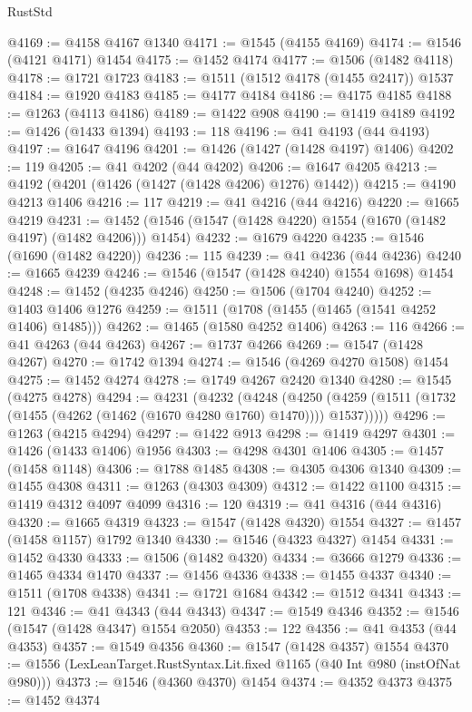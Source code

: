 \begin{lexlean}{RustStd}
\begin{coremodule}
@4169 := @4158 @4167 @1340
@4171 := @1545 (@4155 @4169)
@4174 := @1546 (@4121 @4171) @1454
@4175 := @1452 @4174
@4177 := @1506 (@1482 @4118)
@4178 := @1721 @1723
@4183 := @1511 (@1512 @4178 (@1455 @2417)) @1537
@4184 := @1920 @4183
@4185 := @4177 @4184
@4186 := @4175 @4185
@4188 := @1263 (@4113 @4186)
@4189 := @1422 @908
@4190 := @1419 @4189
@4192 := @1426 (@1433 @1394)
@4193 := 118
@4196 := @41 @4193 (@44 @4193)
@4197 := @1647 @4196
@4201 := @1426 (@1427 (@1428 @4197) @1406)
@4202 := 119
@4205 := @41 @4202 (@44 @4202)
@4206 := @1647 @4205
@4213 := @4192 (@4201 (@1426 (@1427 (@1428 @4206) @1276) @1442))
@4215 := @4190 @4213 @1406
@4216 := 117
@4219 := @41 @4216 (@44 @4216)
@4220 := @1665 @4219
@4231 := @1452 (@1546 (@1547 (@1428 @4220) @1554 (@1670 (@1482 @4197) (@1482 @4206))) @1454)
@4232 := @1679 @4220
@4235 := @1546 (@1690 (@1482 @4220))
@4236 := 115
@4239 := @41 @4236 (@44 @4236)
@4240 := @1665 @4239
@4246 := @1546 (@1547 (@1428 @4240) @1554 @1698) @1454
@4248 := @1452 (@4235 @4246)
@4250 := @1506 (@1704 @4240)
@4252 := @1403 @1406 @1276
@4259 := @1511 (@1708 (@1455 (@1465 (@1541 @4252 @1406) @1485)))
@4262 := @1465 (@1580 @4252 @1406)
@4263 := 116
@4266 := @41 @4263 (@44 @4263)
@4267 := @1737 @4266
@4269 := @1547 (@1428 @4267)
@4270 := @1742 @1394
@4274 := @1546 (@4269 @4270 @1508) @1454
@4275 := @1452 @4274
@4278 := @1749 @4267 @2420 @1340
@4280 := @1545 (@4275 @4278)
@4294 := @4231
    (@4232
      (@4248
        (@4250 (@4259 (@1511 (@1732 (@1455 (@4262 (@1462 (@1670 @4280 @1760) @1470)))) @1537)))))
@4296 := @1263 (@4215 @4294)
@4297 := @1422 @913
@4298 := @1419 @4297
@4301 := @1426 (@1433 @1406) @1956
@4303 := @4298 @4301 @1406
@4305 := @1457 (@1458 @1148)
@4306 := @1788 @1485
@4308 := @4305 @4306 @1340
@4309 := @1455 @4308
@4311 := @1263 (@4303 @4309)
@4312 := @1422 @1100
@4315 := @1419 @4312 @4097 @4099
@4316 := 120
@4319 := @41 @4316 (@44 @4316)
@4320 := @1665 @4319
@4323 := @1547 (@1428 @4320) @1554
@4327 := @1457 (@1458 @1157) @1792 @1340
@4330 := @1546 (@4323 @4327) @1454
@4331 := @1452 @4330
@4333 := @1506 (@1482 @4320)
@4334 := @3666 @1279
@4336 := @1465 @4334 @1470
@4337 := @1456 @4336
@4338 := @1455 @4337
@4340 := @1511 (@1708 @4338)
@4341 := @1721 @1684
@4342 := @1512 @4341
@4343 := 121
@4346 := @41 @4343 (@44 @4343)
@4347 := @1549 @4346
@4352 := @1546 (@1547 (@1428 @4347) @1554 @2050)
@4353 := 122
@4356 := @41 @4353 (@44 @4353)
@4357 := @1549 @4356
@4360 := @1547 (@1428 @4357) @1554
@4370 := @1556 (LexLeanTarget.RustSyntax.Lit.fixed @1165 (@40 Int @980 (instOfNat @980)))
@4373 := @1546 (@4360 @4370) @1454
@4374 := @4352 @4373
@4375 := @1452 @4374

\end{coremodule}
\end{lexlean}
